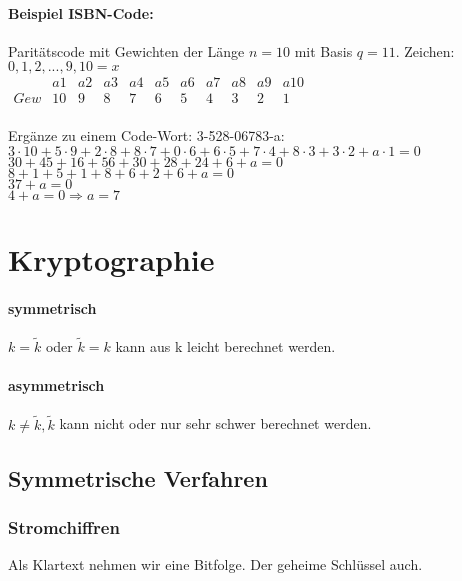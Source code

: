 \paragraph{Beispiel ISBN-Code:} Paritätscode mit Gewichten der Länge $n=10$ mit Basis $q=11$. Zeichen: $0,1,2,...,9,10=x$\\
$\begin{array}{ccccccccccc}
 & a1 & a2 & a3 & a4 & a5 & a6 & a7 & a8 & a9 & a10 \\ 
Gew & 10 & 9 & 8 & 7 & 6 & 5 & 4 & 3 & 2 & 1
\end{array}$
\\\\
Ergänze zu einem Code-Wort: 3-528-06783-a:\\
$3\cdot 10+5\cdot 9+2\cdot 8+8\cdot 7+0\cdot 6+6\cdot 5+7\cdot 4+8\cdot 3+3\cdot 2+a\cdot 1=0$\\
$30+45+16+56+30+28+24+6+a=0$\\
$8+1+5+1+8+6+2+6+a=0$\\
$37+a=0$\\
$4+a=0 \Rightarrow a=7$

\section{Kryptographie}



\paragraph{symmetrisch} $k=\tilde{k}$ oder $\tilde{k}=k$ kann aus k leicht berechnet werden. 
\paragraph{asymmetrisch} $k \neq \tilde{k}, \tilde{k}$ kann nicht oder nur sehr schwer berechnet werden.

\subsection{Symmetrische Verfahren}
\subsubsection{Stromchiffren}
Als Klartext nehmen wir eine Bitfolge. Der geheime Schlüssel auch. 

